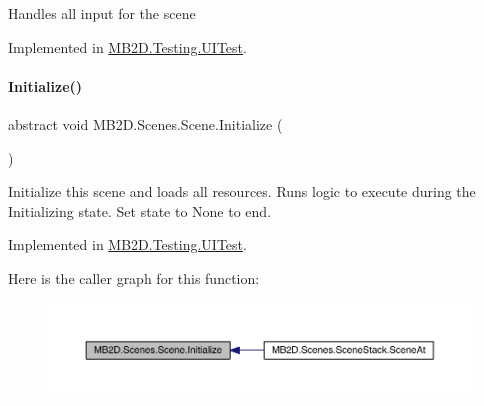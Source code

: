 Handles all input for the scene 



Implemented in \hyperlink{class_m_b2_d_1_1_testing_1_1_u_i_test_abfdabac63f2f6dd07e49c181ce84b24d}{M\+B2\+D.\+Testing.\+U\+I\+Test}.

\hypertarget{class_m_b2_d_1_1_scenes_1_1_scene_a081b4f8866936b495bdce388a7c96c25}{}\label{class_m_b2_d_1_1_scenes_1_1_scene_a081b4f8866936b495bdce388a7c96c25} 
\paragraph{\texorpdfstring{Initialize()}{Initialize()}}
{\footnotesize\ttfamily abstract void M\+B2\+D.\+Scenes.\+Scene.\+Initialize (\begin{DoxyParamCaption}{ }\end{DoxyParamCaption})\hspace{0.3cm}{\ttfamily [pure virtual]}}



Initialize this scene and loads all resources. Runs logic to execute during the Initializing state. Set state to None to end. 



Implemented in \hyperlink{class_m_b2_d_1_1_testing_1_1_u_i_test_af6f33faaa93d646edd5c74dfee6139d1}{M\+B2\+D.\+Testing.\+U\+I\+Test}.

Here is the caller graph for this function\+:
\nopagebreak
\begin{figure}[H]
\begin{center}
\leavevmode
\includegraphics[width=350pt]{class_m_b2_d_1_1_scenes_1_1_scene_a081b4f8866936b495bdce388a7c96c25_icgraph}
\end{center}
\end{figure}
\hypertarget{class_m_b2_d_1_1_scenes_1_1_scene_a0661eff0223150fa8e9ea88145409e5d}{}\label{class_m_b2_d_1_1_scenes_1_1_scene_a0661eff0223150fa8e9ea88145409e5d} 
